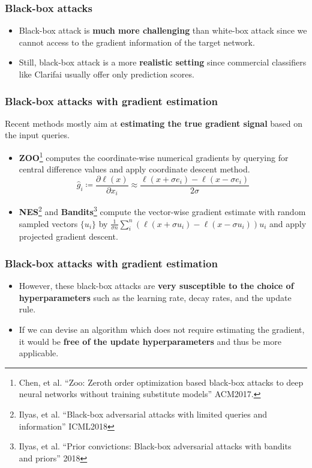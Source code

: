 \documentclass[10pt,mathserif]{beamer}
\begin{document}
\begin{frame}
    \frametitle{Black-box attacks}
    \begin{itemize}\itemsep=12pt
        \item Black-box attack is \textbf{much more challenging} than white-box attack since we cannot access to the gradient information of the target network.\pause
        \item Still, black-box attack is a more \textbf{realistic setting} since commercial classifiers like Clarifai usually offer only prediction scores.
    \end{itemize}
    
\end{frame}

\begin{frame}
\frametitle{Black-box attacks with gradient estimation}
Recent methods mostly aim at \textbf{estimating the true gradient signal} based on the input queries.\pause
\vspace{1em}
\begin{itemize}\itemsep=12pt
\item \textbf{ZOO}\footnote{\scriptsize {\color{blue} Chen, et al.} ``Zoo: Zeroth order optimization based black-box attacks to deep neural networks without training substitute models'' {\color{gray} ACM2017}.} computes the coordinate-wise numerical gradients by querying for central difference values and apply coordinate descent method.
    \[\hat g_i \coloneqq \frac{\partial \ell(x)}{\partial x_i} \approx \frac{\ell (x+\sigma e_i) - \ell (x-\sigma e_i)}{2\sigma}\] \vspace{-1.5em} \pause
\item \textbf{NES}\footnote{\scriptsize {\color{blue} Ilyas, et al.} ``Black-box adversarial attacks with limited queries and information'' {\color{gray}ICML2018}} and \textbf{Bandits}\footnote{\scriptsize {\color{blue}Ilyas, et al.} ``Prior convictions: Black-box adversarial attacks with bandits and priors'' {\color{gray} 2018}} compute the vector-wise gradient estimate with random sampled vectors $\{u_i\}$ by $\frac{1}{\sigma n} \sum_{i}^{n}(\ell(x+\sigma u_i)-\ell(x-\sigma u_i))u_i$ and apply projected gradient descent.
\end{itemize}
\end{frame}

\begin{frame}
\frametitle{Black-box attacks with gradient estimation}
\begin{itemize}\itemsep=12pt
        \item However, these black-box attacks are \textbf{very susceptible to the choice of hyperparameters} such as the learning rate, decay rates, and the update rule.\pause
        \item If we can devise an algorithm which does not require estimating the gradient, it would be \textbf{free of the update hyperparameters} and thus be more applicable.
\end{itemize}
\end{frame}
\end{document}
